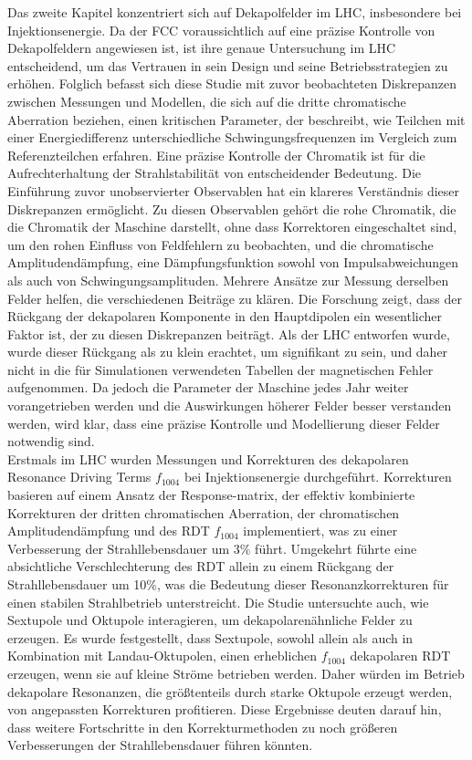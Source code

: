 {%
Das zweite Kapitel konzentriert sich auf Dekapolfelder im LHC, insbesondere bei Injektionsenergie.
Da der FCC voraussichtlich auf eine präzise Kontrolle von Dekapolfeldern angewiesen ist, ist ihre
genaue Untersuchung im LHC entscheidend, um das Vertrauen in sein Design und seine
Betriebsstrategien zu erhöhen. Folglich befasst sich diese Studie mit zuvor beobachteten
Diskrepanzen zwischen Messungen und Modellen, die sich auf die dritte chromatische Aberration
beziehen, einen kritischen Parameter, der beschreibt, wie Teilchen mit einer Energiedifferenz
unterschiedliche Schwingungsfrequenzen im Vergleich zum Referenzteilchen erfahren. Eine präzise
Kontrolle der Chromatik ist für die Aufrechterhaltung der Strahlstabilität von entscheidender
Bedeutung. Die Einführung zuvor unobservierter Observablen hat ein klareres Verständnis dieser
Diskrepanzen ermöglicht. Zu diesen Observablen gehört die rohe Chromatik, die die Chromatik der
Maschine darstellt, ohne dass Korrektoren eingeschaltet sind, um den rohen Einfluss von Feldfehlern
zu beobachten, und die chromatische Amplitudendämpfung, eine Dämpfungsfunktion sowohl von
Impulsabweichungen als auch von Schwingungsamplituden. Mehrere Ansätze zur Messung derselben Felder
helfen, die verschiedenen Beiträge zu klären. Die Forschung zeigt, dass der Rückgang der dekapolaren
Komponente in den Hauptdipolen ein wesentlicher Faktor ist, der zu diesen Diskrepanzen beiträgt. Als
der LHC entworfen wurde, wurde dieser Rückgang als zu klein erachtet, um signifikant zu sein, und
daher nicht in die für Simulationen verwendeten Tabellen der magnetischen Fehler aufgenommen. Da
jedoch die Parameter der Maschine jedes Jahr weiter vorangetrieben werden und die Auswirkungen
höherer Felder besser verstanden werden, wird klar, dass eine präzise Kontrolle und Modellierung
dieser Felder notwendig sind.
\\
\indent
Erstmals im LHC wurden Messungen und Korrekturen des dekapolaren Resonance Driving Terms
$f_{1004}$ bei Injektionsenergie durchgeführt. Korrekturen basieren auf einem Ansatz der
Response-matrix, der effektiv kombinierte Korrekturen der dritten chromatischen Aberration, der
chromatischen Amplitudendämpfung und des RDT $f_{1004}$ implementiert, was zu einer Verbesserung der
Strahllebensdauer um 3\% führt. Umgekehrt führte eine absichtliche Verschlechterung des RDT allein
zu einem Rückgang der Strahllebensdauer um 10\%, was die Bedeutung dieser Resonanzkorrekturen für
einen stabilen Strahlbetrieb unterstreicht. Die Studie untersuchte auch, wie Sextupole und Oktupole
interagieren, um dekapolarenähnliche Felder zu erzeugen. Es wurde festgestellt, dass Sextupole,
sowohl allein als auch in Kombination mit Landau-Oktupolen, einen erheblichen $f_{1004}$ dekapolaren
RDT erzeugen, wenn sie auf kleine Ströme betrieben werden. Daher würden im Betrieb dekapolare
Resonanzen, die größtenteils durch starke Oktupole erzeugt werden, von angepassten Korrekturen
profitieren. Diese Ergebnisse deuten darauf hin, dass weitere Fortschritte in den Korrekturmethoden
zu noch größeren Verbesserungen der Strahllebensdauer führen könnten.

}
